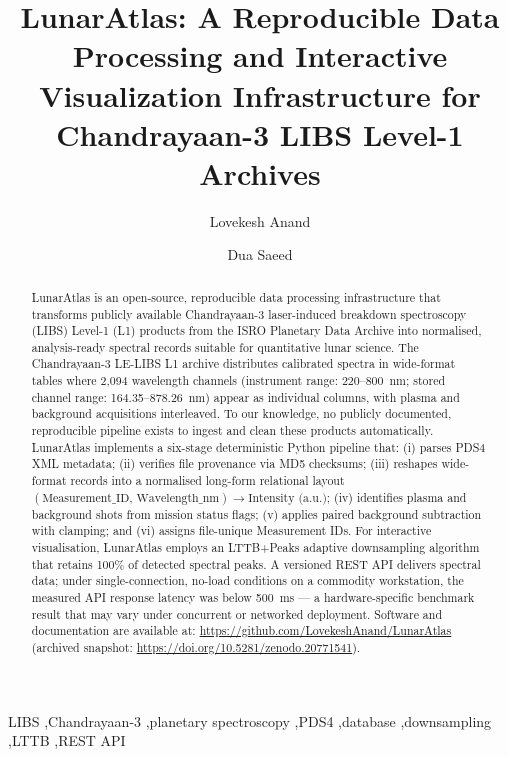 \documentclass[final,5p,twocolumn,a4paper]{elsarticle}
\begin{document}
\renewcommand{\labelenumii}{\arabic{enumi}.\arabic{enumii}}

\begin{frontmatter}

\title{LunarAtlas: A Reproducible Data Processing and Interactive Visualization Infrastructure for Chandrayaan-3 LIBS Level-1 Archives}

\author{Lovekesh Anand}
\author{Dua Saeed}

\address{Department of Computer Science and Engineering, Maharshi Dayanand University, Rohtak, Haryana, India}

\begin{abstract}
LunarAtlas is an open-source, reproducible data processing infrastructure that transforms publicly available Chandrayaan-3 laser-induced breakdown spectroscopy (LIBS) Level-1 (L1) products from the ISRO Planetary Data Archive into normalised, analysis-ready spectral records suitable for quantitative lunar science. The Chandrayaan-3 LE-LIBS L1 archive distributes calibrated spectra in wide-format tables where 2,094 wavelength channels (instrument range: 220--800~nm; stored channel range: 164.35--878.26~nm) appear as individual columns, with plasma and background acquisitions interleaved. To our knowledge, no publicly documented, reproducible pipeline exists to ingest and clean these products automatically. LunarAtlas implements a six-stage deterministic Python pipeline that: (i) parses PDS4 XML metadata; (ii) verifies file provenance via MD5 checksums; (iii) reshapes wide-format records into a normalised long-form relational layout $(\text{Measurement\_ID},\,\text{Wavelength\_nm}) \rightarrow \text{Intensity (a.u.)}$; (iv) identifies plasma and background shots from mission status flags; (v) applies paired background subtraction with clamping; and (vi) assigns file-unique Measurement IDs. For interactive visualisation, LunarAtlas employs an LTTB+Peaks adaptive downsampling algorithm that retains 100\% of detected spectral peaks. A versioned REST API delivers spectral data; under single-connection, no-load conditions on a commodity workstation, the measured API response latency was below 500~ms --- a hardware-specific benchmark result that may vary under concurrent or networked deployment. Software and documentation are available at: \url{https://github.com/LovekeshAnand/LunarAtlas} (archived snapshot: \url{https://doi.org/10.5281/zenodo.20771541}).
\end{abstract}

\begin{keyword}
LIBS \sep Chandrayaan-3 \sep planetary spectroscopy \sep PDS4 \sep database \sep downsampling \sep LTTB \sep REST API
\end{keyword}

\end{frontmatter}
\end{document}
